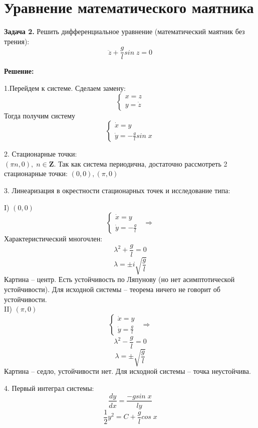 \documentclass[10pt]{report}
\begin{document}
\section {Уравнение математического маятника}
\textbf{Задача 2.} Решить дифференциальное уравнение (математический маятник без трения):
\begin{equation}
\ddot{z}+\frac g l sin\;z=0
\end{equation}

\textbf{Решение:}

1.Перейдем к системе. Сделаем замену:
\[ \left\{
\begin{array}{lr}
x=z\\
y=\dot{z}
\end{array}
\right.\]
Тогда получим систему 
\[ \left\{
\begin{array}{lr}
\dot{x}=y\\
\dot{y}=- \frac g l sin\;x
\end{array}
\right.\]

2. Стационарные точки:\\
$(\pi n,0), \; n\in \textbf{Z}. $ Так как система периодична, достаточно рассмотреть 2 стационарные точки: $(0,0), (\pi,0)$

3. Линеаризация в окрестности стационарных точек и исследование типа:

I) $(0,0)$
\[ \left\{
\begin{array}{lr}
\dot{x}=y\\
\dot{y}=- \frac g l
\end{array}
\right.\;\;\Rightarrow\]
Характеристический многочлен:
\[\lambda^2+\frac g l =0\]
\[\lambda=\pm i \sqrt{\frac g l }\]
Картина -- центр. Есть устойчивость по Ляпунову (но нет асимптотической устойчивости). Для исходной системы -- теорема ничего не говорит об устойчивости. \\
II) $(\pi,0)$
\[ \left\{
\begin{array}{lr}
\dot{x}=y\\
\dot{y}= \frac g l
\end{array}
\right.\;\;\Rightarrow\]
\[\lambda^2-\frac g l =0\]
\[\lambda=\pm  \sqrt{\frac g l }\]
Картина -- седло, устойчивости нет. Для исходной системы -- точка неустойчива. 

4. Первый интеграл системы:
\[ \frac {dy} {dx}= \frac{-gsin\;x}{ly}\]
\begin{equation}
\frac 1 2 y^2=C+\frac g l cos\; x
\end{equation}
\end{document}
